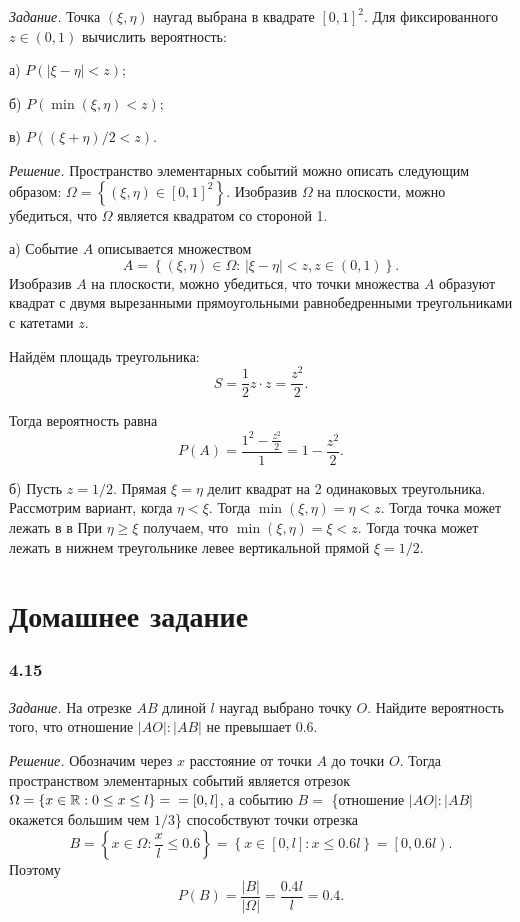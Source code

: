 \documentclass{book}
\begin{document}
\textit{Задание.} Точка $ \left( \xi, \eta \right) $ наугад выбрана в квадрате $ \left[ 0, 1 \right]^2$.
Для фиксированного $z \in \left( 0, 1 \right) $ вычислить вероятность:

а) $P \left( \left| \xi - \eta \right| < z \right) $;

б) $P \left( \min \left( \xi, \eta \right) < z \right) $;

в) $P \left( \left( \xi + \eta \right)/2 < z \right) $.

\textit{Решение.}
Пространство элементарных событий можно описать следующим образом:
$ \Omega =
\left\{ \left( \xi, \eta \right) \in \left[ 0, 1 \right]^2 \right\} $.
Изобразив $ \Omega $ на плоскости, можно убедиться, что $ \Omega $ является квадратом со стороной 1.

а) Событие $A$ описывается множеством
$$A =
\left\{ \left( \xi, \eta \right) \in \Omega: \,
\left| \xi - \eta \right| < z,
z \in \left( 0, 1 \right) \right\}.$$
Изобразив $A$ на плоскости,
можно убедиться,
что точки множества $A$ образуют квадрат с двумя вырезанными прямоугольными равнобедренными треугольниками с катетами $z$.

Найдём площадь треугольника:
$$S = \frac{1}{2} z \cdot z =
\frac{z^2}{2}.$$

Тогда вероятность равна
$$P \left( A \right) =
\frac{1^2 - \frac{z^2}{2}}{1} =
1 - \frac{z^2}{2}.$$

б) Пусть $z = 1/2$.
Прямая $ \xi = \eta $ делит квадрат на 2 одинаковых треугольника.
Рассмотрим вариант, когда $ \eta < \xi $. Тогда $ \min \left( \xi, \eta \right) = \eta < z$.
Тогда точка может лежать в в
При $\eta \geq \xi $ получаем, что $ \min \left( \xi, \eta \right) = \xi < z$.
Тогда точка может лежать в нижнем треугольнике левее вертикальной прямой $ \xi = 1/2$.


\section*{Домашнее задание}

\subsubsection*{4.15}

\textit{Задание.} На отрезке $AB$ длиной $l$ наугад выбрано точку $O$.
Найдите вероятность того, что отношение $|AO|:|AB|$ не превышает $0.6$.

\textit{Решение.} Обозначим через $x$ расстояние от точки $A$ до точки $O$.
Тогда пространством элементарных событий является отрезок
$ \Omega =
\left\{ x \in \mathbb{R}: 0 \leq x \leq l \right\} = \\
= \left[ 0, l \right] $,
а событию $B = $ 
\{отношение $|AO|:|AB|$ окажется большим чем $1/3$\}
способствуют точки отрезка
$$B =
\left\{ x \in \Omega : \frac{x}{l} \leq 0.6 \right\} =
\left\{ x \in \left[ 0, l \right] : x \leq 0.6 l \right\} =
\left[ 0, 0.6 l \right).$$
Поэтому
$$P \left( B \right) =
\frac{|B|}{| \Omega |} =
\frac{0.4 l}{l} =
0.4.$$
\end{document}
